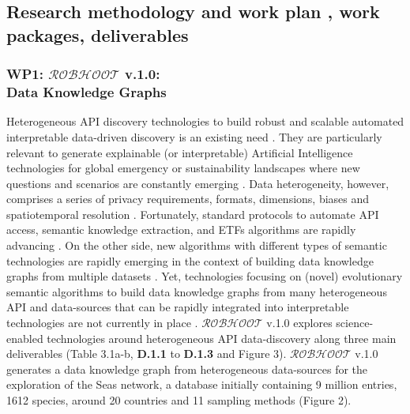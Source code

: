 \documentclass[11pt, a4paper]{article} %
\begin{document}
{  
\subsection{Research methodology and work plan , work packages,
  deliverables}

\subsubsection{{\bf WP1: $\mathcal{ROBHOOT}$ v.1.0}: \\ Data Knowledge
  Graphs}

Heterogeneous API discovery technologies to build robust and scalable
automated interpretable data-driven discovery is an existing need
\citep{Fan2012,Staar2018}. They are particularly relevant to generate
explainable (or interpretable) Artificial Intelligence technologies
for global emergency or sustainability landscapes where new questions
and scenarios are constantly emerging \citep{Futia2020}. Data
heterogeneity, however, comprises a series of privacy requirements,
formats, dimensions, biases and spatiotemporal resolution
\citep{Openstreetmap,Bluecloud,HOT,Elixir}. Fortunately, standard
protocols to automate API access, semantic knowledge extraction, and
ETFs algorithms are rapidly advancing
\citep{Fan2012,APISGURU,OpenKnowledgeFoundation}. On the other side,
new algorithms with different types of semantic technologies are
rapidly emerging in the context of building data knowledge graphs from
multiple datasets \citep{KGcovid19}. Yet, technologies focusing on
(novel) evolutionary semantic algorithms to build data knowledge
graphs from many heterogeneous API and data-sources that can be
rapidly integrated into interpretable technologies are not currently
in place \citep{Futia2020}. $\mathcal{ROBHOOT}$ v.1.0 explores
science-enabled technologies around heterogeneous API data-discovery
along three main deliverables (Table 3.1a-b, {\bf D.1.1} to {\bf
  D.1.3} and Figure 3). $\mathcal{ROBHOOT}$ v.1.0 generates a data
knowledge graph from heterogeneous data-sources for the exploration of
the Seas network, a database initially containing 9 million entries,
1612 species, around 20 countries and 11 sampling methods (Figure 2).
      
}
\end{document}
